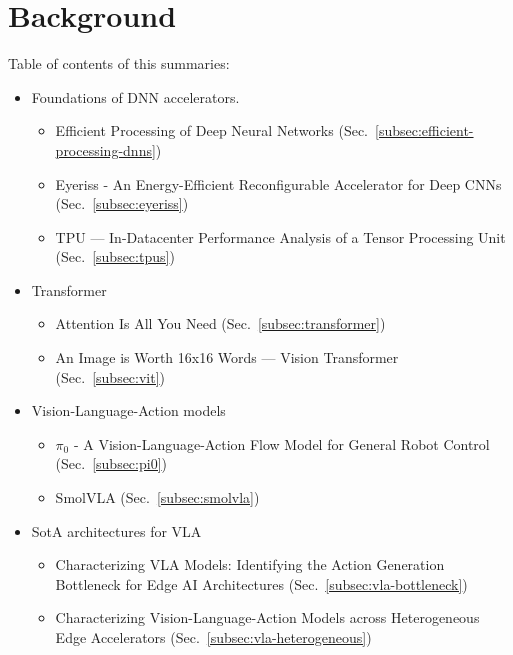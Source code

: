 
\section{Background}
\label{sec:background}
Table of contents of this summaries:
\begin{itemize}
    \item Foundations of DNN accelerators.
    \begin{itemize}
        \item Efficient Processing of Deep Neural Networks \cite{sze2020efficient}
          (Sec.~\ref{subsec:efficient-processing-dnns})
        \item Eyeriss - An Energy-Efficient Reconfigurable Accelerator for Deep CNNs \cite{chen2016eyeriss} (Sec.~\ref{subsec:eyeriss})
        \item TPU — In-Datacenter Performance Analysis of a Tensor Processing Unit \cite{jouppi2017datacenter} (Sec.~\ref{subsec:tpus})
    \end{itemize}
    \item Transformer
    \begin{itemize}
        \item Attention Is All You Need \cite{vaswani2017attention} (Sec.~\ref{subsec:transformer})
        \item An Image is Worth 16x16 Words — Vision Transformer \cite{dosovitskiy2020image} (Sec.~\ref{subsec:vit})
    \end{itemize}
    \item Vision-Language-Action models
    \begin{itemize}
        \item $\pi_0$ - A Vision-Language-Action Flow Model for General Robot Control \cite{black2024pi0} (Sec.~\ref{subsec:pi0})
        \item SmolVLA \cite{smolvla2025} (Sec.~\ref{subsec:smolvla})
    \end{itemize}
    \item SotA architectures for VLA 
    \begin{itemize}
        \item Characterizing VLA Models: Identifying the Action Generation Bottleneck for Edge AI Architectures \cite{vlabottleneck2026}(Sec.~\ref{subsec:vla-bottleneck})
        \item Characterizing Vision-Language-Action Models across Heterogeneous Edge Accelerators \cite{vlaxpus2026} (Sec.~\ref{subsec:vla-heterogeneous})
    \end{itemize}
\end{itemize}


